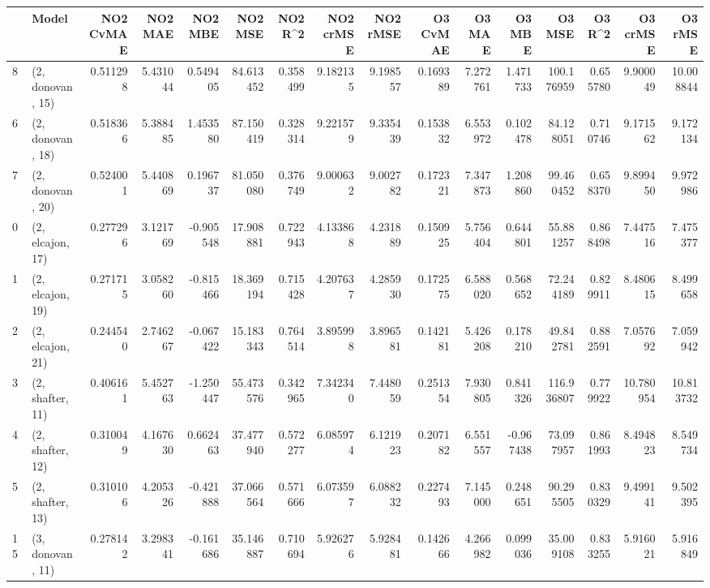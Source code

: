 \begin{tabular}{llrrrrrrrrrrrrrr}
\toprule
{} &             Model &  NO2 CvMAE &   NO2 MAE &   NO2 MBE &    NO2 MSE &   NO2 R\textasciicircum2 &  NO2 crMSE &  NO2 rMSE &  O3 CvMAE &    O3 MAE &    O3 MBE &      O3 MSE &    O3 R\textasciicircum2 &   O3 crMSE &    O3 rMSE \\
\midrule
8  &  (2, donovan, 15) &   0.511298 &  5.431044 &  0.549405 &  84.613452 &  0.358499 &   9.182135 &  9.198557 &  0.169389 &  7.272761 &  1.471733 &  100.176959 &  0.655780 &   9.900049 &  10.008844 \\
6  &  (2, donovan, 18) &   0.518366 &  5.388485 &  1.453580 &  87.150419 &  0.328314 &   9.221579 &  9.335439 &  0.153832 &  6.553972 &  0.102478 &   84.128051 &  0.710746 &   9.171562 &   9.172134 \\
7  &  (2, donovan, 20) &   0.524001 &  5.440869 &  0.196737 &  81.050080 &  0.376749 &   9.000632 &  9.002782 &  0.172321 &  7.347873 &  1.208860 &   99.460452 &  0.658370 &   9.899450 &   9.972986 \\
0  &  (2, elcajon, 17) &   0.277296 &  3.121769 & -0.905548 &  17.908881 &  0.722943 &   4.133868 &  4.231889 &  0.150925 &  5.756404 &  0.644801 &   55.881257 &  0.868498 &   7.447516 &   7.475377 \\
1  &  (2, elcajon, 19) &   0.271715 &  3.058260 & -0.815466 &  18.369194 &  0.715428 &   4.207637 &  4.285930 &  0.172575 &  6.588020 &  0.568652 &   72.244189 &  0.829911 &   8.480615 &   8.499658 \\
2  &  (2, elcajon, 21) &   0.244540 &  2.746267 & -0.067422 &  15.183343 &  0.764514 &   3.895998 &  3.896581 &  0.142181 &  5.426208 &  0.178210 &   49.842781 &  0.882591 &   7.057692 &   7.059942 \\
3  &  (2, shafter, 11) &   0.406161 &  5.452763 & -1.250447 &  55.473576 &  0.342965 &   7.342340 &  7.448059 &  0.251354 &  7.930805 &  0.841326 &  116.936807 &  0.779922 &  10.780954 &  10.813732 \\
4  &  (2, shafter, 12) &   0.310049 &  4.167630 &  0.662463 &  37.477940 &  0.572277 &   6.085974 &  6.121923 &  0.207182 &  6.551557 & -0.967438 &   73.097957 &  0.861993 &   8.494823 &   8.549734 \\
5  &  (2, shafter, 13) &   0.310106 &  4.205326 & -0.421888 &  37.066564 &  0.571666 &   6.073597 &  6.088232 &  0.227493 &  7.145000 &  0.248651 &   90.295505 &  0.830329 &   9.499141 &   9.502395 \\
15 &  (3, donovan, 11) &   0.278142 &  3.298341 & -0.161686 &  35.146887 &  0.710694 &   5.926276 &  5.928481 &  0.142666 &  4.266982 &  0.099036 &   35.009108 &  0.833255 &   5.916021 &   5.916849 \\

\end{tabular}
